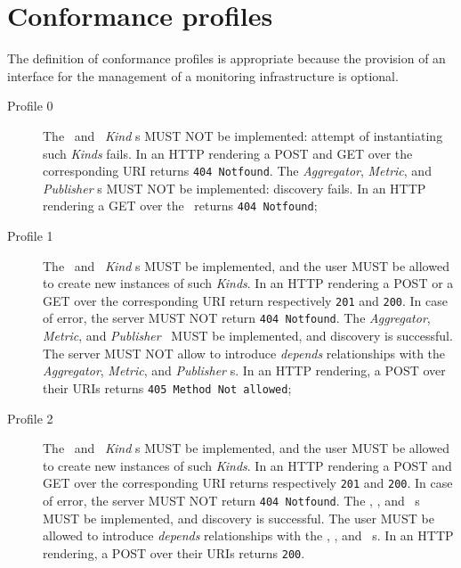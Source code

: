 \documentclass[12pt]{article}  %
\begin{document}

\section{Conformance profiles}

The definition of conformance profiles is appropriate because the provision of an interface for the management of a monitoring infrastructure is optional. 

\begin{description}

\item[Profile 0] The \coll\ and \sens\ {\em Kind} s MUST NOT be implemented: attempt of instantiating such {\em Kinds} fails.  In an HTTP rendering a POST and GET over the corresponding URI returns {\tt 404 Notfound}. The {\em Aggregator}, {\em Metric}, and {\em Publisher} \mi s MUST NOT be implemented: discovery fails. In an HTTP rendering a GET over the \mi\ returns {\tt 404 Notfound}; 

\item[Profile 1] The \coll\ and \sens\ {\em Kind} s MUST be implemented, and the user MUST be allowed to create new instances of such {\em Kinds}.  In an HTTP rendering a POST or a GET over the corresponding URI return respectively {\tt 201} and {\tt 200}. In case of error, the server MUST NOT return {\tt 404 Notfound}. The {\em Aggregator}, {\em Metric}, and {\em Publisher} \mi\ MUST be implemented, and discovery is successful. The server MUST NOT allow to introduce {\em depends} relationships with the {\em Aggregator}, {\em Metric}, and {\em Publisher} \mi s. In an HTTP rendering, a POST over their URIs returns {\tt 405 Method Not allowed}; 

\item[Profile 2]  The \coll\ and \sens\ {\em Kind} s MUST be implemented, and the user MUST be allowed to create new instances of such {\em Kinds}.  In an HTTP rendering a POST and GET over the corresponding URI returns respectively {\tt 201} and {\tt 200}. In case of error, the server MUST NOT return {\tt 404 Notfound}. The \aggr , \metr , and \publ\ \mi s MUST be implemented, and discovery is successful. The user MUST be allowed to introduce {\em depends} relationships with the  \aggr , \metr , and \publ\ \mi s. In an HTTP rendering, a POST over their URIs returns {\tt 200}.

\end{description}
\end{document}
